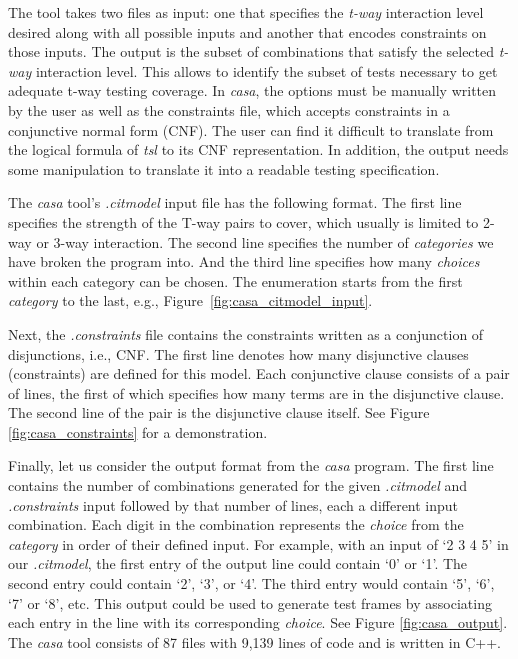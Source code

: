 \documentclass[a4full,12pt]{article}
\begin{document}
  The tool takes two files as input: one that specifies the \emph{t-way} interaction
  level desired along with all possible inputs and another that encodes constraints on those
  inputs. The output is the subset of combinations that satisfy the selected \emph{t-way}
  interaction level. This allows to identify the subset of tests necessary to get adequate
  t-way testing coverage. In \emph{casa}, the options must be manually written by the user as well as the constraints
  file, which accepts constraints in a conjunctive normal form (CNF). The user can find it difficult to translate from the logical formula of \emph{tsl} to its CNF representation. In addition, the output needs some manipulation to translate it into a readable testing specification.
  
The \emph{casa} tool's \emph{.citmodel} input file has the following format. The first line
  specifies the strength of the T-way pairs to cover, which usually is limited to 2-way or 3-way interaction. The second line specifies the number
  of \emph{categories} we have broken the program into. And the third line specifies how
  many \emph{choices} within each category can be chosen. The enumeration starts from the first \emph{category} to
  the last, e.g., Figure~\ref{fig:casa_citmodel_input}. 
  
  Next, the \emph{.constraints}
  file contains the constraints written as a conjunction of disjunctions, i.e., CNF. The first line
denotes how many disjunctive clauses (constraints) are defined for this model. Each
  conjunctive clause consists of a pair of lines, the first of which specifies how many terms
are in the disjunctive clause. The second line of the pair is the disjunctive clause itself. See Figure \ref{fig:casa_constraints} for a demonstration.

Finally, let us consider the output format from the \emph{casa} program. The first line contains
  the number of combinations generated for the given \emph{.citmodel} and \emph{.constraints}
  input followed by that number of lines, each a different input combination. Each digit in
  the combination represents the \emph{choice} from the \emph{category} in order of their
  defined input. For example, with an input of `2 3 4 5' in our \emph{.citmodel}, the first
  entry of the output line could contain `0' or `1'. The second entry could contain `2', `3',
  or `4'. The third entry would contain `5', `6', `7' or `8', etc. This output could be used
  to generate test frames by associating each entry in the line with its corresponding
  \emph{choice}. See Figure \ref{fig:casa_output}. The \emph{casa} tool consists of 87 files
  with 9,139 lines of code and is written in C++.
  
\end{document}
